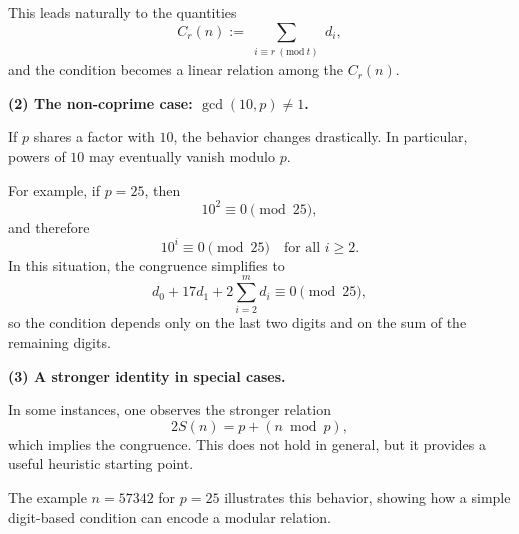 \documentclass[12pt]{article}
\begin{document}
This leads naturally to the quantities
\[
C_r(n) := \sum_{\substack{i \equiv r \ (\mathrm{mod}\ t)}} d_i,
\]
and the condition becomes a linear relation among the $C_r(n)$.

\medskip

\textbf{(2) The non-coprime case: $\gcd(10,p)\neq 1$.}

If $p$ shares a factor with $10$, the behavior changes drastically. In particular, powers of $10$ may eventually vanish modulo $p$.

For example, if $p=25$, then
\[
10^2 \equiv 0 \pmod{25},
\]
and therefore
\[
10^i \equiv 0 \pmod{25} \quad \text{for all } i \ge 2.
\]
In this situation, the congruence simplifies to
\[
d_0 + 17d_1 + 2\sum_{i=2}^m d_i \equiv 0 \pmod{25},
\]
so the condition depends only on the last two digits and on the sum of the remaining digits.

\medskip

\textbf{(3) A stronger identity in special cases.}

In some instances, one observes the stronger relation
\[
2S(n) = p + (n \bmod p),
\]
which implies the congruence. This does not hold in general, but it provides a useful heuristic starting point.

\medskip

The example $n=57342$ for $p=25$ illustrates this behavior, showing how a simple digit-based condition can encode a modular relation.
\end{document}
